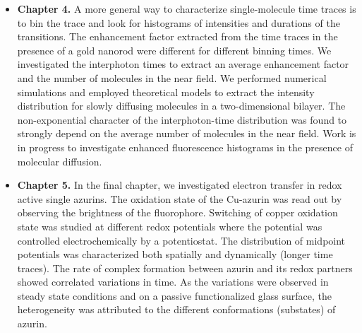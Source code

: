 \begin{itemize}
	\item \textbf{Chapter 4.} A more general way to characterize single-molecule time traces is to bin the trace and look for histograms of intensities and durations of the transitions.
	The enhancement factor extracted from the time traces in the presence of a gold nanorod were different for different binning times.
	We investigated the interphoton times to extract an average enhancement factor and the number of molecules in the near field.
	We performed numerical simulations and employed theoretical models to extract the intensity distribution for slowly diffusing molecules in a two-dimensional bilayer.
	The non-exponential character of the interphoton-time distribution was found to strongly depend on the average number of molecules in the near field. Work is in progress to investigate enhanced fluorescence histograms in the presence of molecular diffusion.

	\item \textbf{Chapter 5.} In the final chapter, we investigated electron transfer in redox active single azurins.
	The oxidation state of the Cu-azurin was read out by observing the brightness of the fluorophore.
	Switching of copper oxidation state was studied at different redox potentials where the potential was controlled electrochemically by a potentiostat.
	The distribution of midpoint potentials was characterized both spatially and dynamically (longer time traces).
	The rate of complex formation between azurin and its redox partners showed correlated variations in time.
	As the variations were observed in steady state conditions and on a passive functionalized glass surface, the heterogeneity was attributed to the different conformations (substates) of azurin.
\end{itemize}

